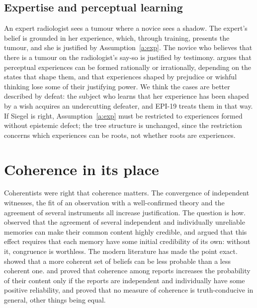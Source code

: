 \documentclass{situationist-preprint}
\begin{document}
\subsection{Expertise and perceptual learning}

An expert radiologist sees a tumour where a novice sees a shadow. The expert's belief is grounded in her experience, which, through training, presents the tumour, and she is justified by Assumption~\ref{a:exp}. The novice who believes that there is a tumour on the radiologist's say-so is justified by testimony. \citet{Siegel2017} argues that perceptual experiences can be formed rationally or irrationally, depending on the states that shape them, and that experiences shaped by prejudice or wishful thinking lose some of their justifying power. We think the cases are better described by defeat: the subject who learns that her experience has been shaped by a wish acquires an undercutting defeater, and EPI-19 treats them in that way. If Siegel is right, Assumption~\ref{a:exp} must be restricted to experiences formed without epistemic defect; the tree structure is unchanged, since the restriction concerns which experiences can be roots, not whether roots are experiences.

\section{Coherence in its place}\label{s:coherence}

Coherentists were right that coherence matters. The convergence of independent witnesses, the fit of an observation with a well-confirmed theory and the agreement of several instruments all increase justification. The question is how. \citet{CILewis1946} observed that the agreement of several independent and individually unreliable memories can make their common content highly credible, and argued that this effect requires that each memory have some initial credibility of its own: without it, congruence is worthless. The modern literature has made the point exact. \citet{KleinWarfield1994} showed that a more coherent set of beliefs can be less probable than a less coherent one. \citet{Shogenji1999} and \citet{Olsson2005} proved that coherence among reports increases the probability of their content only if the reports are independent and individually have some positive reliability, and \citet{BovensHartmann2003} proved that no measure of coherence is truth-conducive in general, other things being equal.
\end{document}
